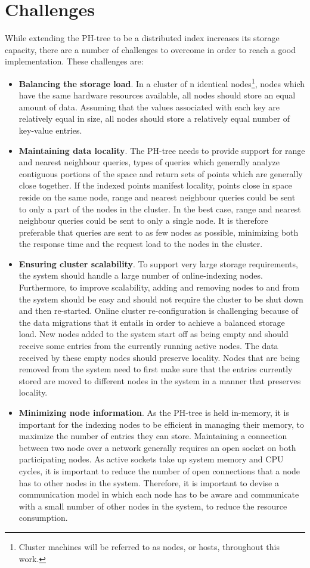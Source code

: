 \documentclass[11pt,a4paper]{globis-book}
\begin{document}
\section{Challenges}
\label{sec:distindex-challenges}

While extending the PH-tree to be a distributed index increases its storage capacity, there are a number of challenges to overcome in order to reach a good implementation. These challenges are:
\begin{itemize}
    \item \textbf{Balancing the storage load}. In a cluster of n identical nodes\footnote{Cluster machines will be referred to as nodes, or hosts, throughout this work.}, nodes which have the same hardware resources available, all nodes should store an equal amount of data. Assuming that the values associated with each key are relatively equal in size, all nodes should store a relatively equal number of key-value entries.
    \item \textbf{Maintaining data locality}. The PH-tree needs to provide support for range and nearest neighbour queries, types of queries which generally analyze contiguous portions of the space and return sets of points which are generally close together. If the indexed points manifest locality, points close in space reside on the same node, range and nearest neighbour queries could be sent to only a part of the nodes in the cluster. In the best case, range and nearest neighbour queries could be sent to only a single node. It is therefore preferable that queries are sent to as few nodes as possible, minimizing both the response time and the request load to the nodes in the cluster.
    \item \textbf{Ensuring cluster scalability}. To support very large storage requirements, the system should handle a large number of online-indexing nodes. Furthermore, to improve scalability, adding and removing nodes to and from the system should be easy and should not require the cluster to be shut down and then re-started. Online cluster re-configuration is challenging because of the data migrations that it entails in order to achieve a balanced storage load. New nodes added to the system start off as being empty and should receive some entries from the currently running active nodes. The data received by these empty nodes should preserve locality. Nodes that are being removed from the system need to first make sure that the entries currently stored are moved to different nodes in the system in a manner that preserves locality. 
    \item \textbf{Minimizing node information}. As the PH-tree is held in-memory, it is important for the indexing nodes to be efficient in managing their memory, to maximize the number of entries they can store. Maintaining a connection between two node over a network generally requires an open socket on both participating nodes. As active sockets take up system memory and CPU cycles, it is important to reduce the number of open connections that a node has to other nodes in the system. Therefore, it is important to devise a communication model in which each node has to be aware and communicate with a small number of other nodes in the system, to reduce the resource consumption.

\end{itemize}
\end{document}

